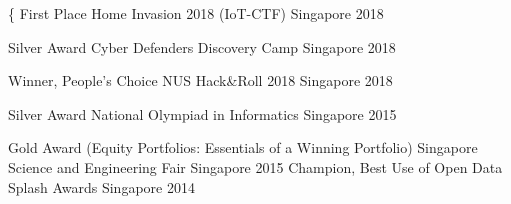


\begin{cvhonors}

\{  \cvhonor
    {First Place} %
    {Home Invasion 2018 (IoT-CTF)} %
    {Singapore} %
    {2018} %

  \cvhonor
    {Silver Award} %
    {Cyber Defenders Discovery Camp} %
    {Singapore} %
    {2018} %

  \cvhonor
    {Winner, People's Choice} %
    {NUS Hack\&Roll 2018} %
    {Singapore} %
    {2018} %

  \cvhonor
    {Silver Award} %
    {National Olympiad in Informatics} %
    {Singapore} %
    {2015} %

  \cvhonor
    {Gold Award (Equity Portfolios: Essentials of a Winning Portfolio)} %
    {Singapore Science and Engineering Fair} %
    {Singapore} %
    {2015} %
  \cvhonor
    {Champion, Best Use of Open Data} %
    {Splash Awards} %
    {Singapore} %
    {2014} %
\end{cvhonors}
